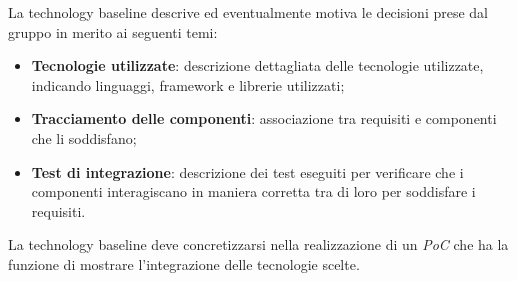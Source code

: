 La technology baseline descrive ed eventualmente motiva le decisioni prese dal gruppo \Gruppo{} in merito ai seguenti temi:

\begin{itemize}
    \item \textbf{Tecnologie utilizzate}: descrizione dettagliata delle tecnologie utilizzate, indicando linguaggi,  framework e librerie utilizzati;
    \item \textbf{Tracciamento delle componenti}: associazione tra requisiti e componenti che li soddisfano;
    \item \textbf{Test di integrazione}: descrizione dei test eseguiti per verificare che i componenti interagiscano in maniera corretta tra di loro per soddisfare i requisiti.
\end{itemize}

La technology baseline deve concretizzarsi nella realizzazione di un \emph{PoC} che ha la funzione di mostrare l'integrazione delle tecnologie scelte.